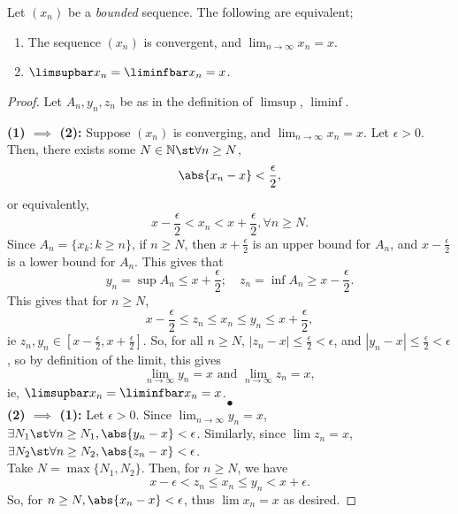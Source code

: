 \documentclass[12pt]{article}
\begin{document}
\begin{theorem}\label{thm:infsupconvergence}
  Let $(x_n)$ be a \emph{bounded} sequence. The following are equivalent;
  \begin{enumerate}
    \item The sequence $(x_n)$ is convergent, and \(\lim_{n\to\infty}x_n = x.\)
    \item $\limsupbar x_n = \liminfbar x_n = x$.
  \end{enumerate}
\end{theorem}

\begin{proof}
  Let $A_n, y_n, z_n$ be as in the definition of $\limsup$, $\liminf$.


  \textbf{(1) $\implies$ (2):} Suppose $(x_n)$ is converging, and $\lim_{n\to\infty}x_n = x$. Let $\epsilon > 0$. Then, there exists some $N \in \mathbb{N} \st \forall n \geq N$,  $$\abs{x_n - x} < \frac{\epsilon}{2},$$ or equivalently, $$x - \frac{\epsilon}{2} < x_n < x + \frac{\epsilon}{2}, \forall n \geq N.$$ Since $A_n = \{x_k : k \geq n\}$, if $n \geq N$, then $x + \frac{\epsilon}{2}$ is an upper bound for $A_n$, and $x - \frac{\epsilon}{2}$ is a lower bound for $A_n$. This gives that \[y_n = \sup A_n \leq x + \frac{\epsilon}{2}; \quad z_n = \inf A_n \geq x - \frac{\epsilon}{2}.\] This gives that for $n \geq N$, $$x - \frac{\epsilon}{2} \leq z_n \leq x_n \leq y_n \leq x + \frac{\epsilon}{2},$$ ie $z_n, y_n \in [x - \frac{\epsilon}{2}, x + \frac{\epsilon}{2}]$. So, for all $n \geq N$, $|z_n - x| \leq \frac{\epsilon}{2} < \epsilon$, and $|y_n - x| \leq \frac{\epsilon}{2} < \epsilon$, so by definition of the limit, this gives \[\lim_{n \to \infty} y_n = x \text{ and } \lim_{n\to\infty} z_n = x,\] ie, $\limsupbar x_n = \liminfbar x_n = x$.
  $$\bullet$$
  \textbf{(2) $\implies$ (1):} Let $\epsilon > 0$. Since $\lim_{n\to\infty} y_n = x$, $\exists N_1 \st \forall n \geq N_1, \abs{y_n - x }< \epsilon$. Similarly, since $\lim z_n = x$, $\exists N_2 \st \forall n \geq N_2, \abs{z_n - x} < \epsilon$.\\
  Take $N = \max \{N_1, N_2\}$. Then, for $n \geq N$, we have \[x - \epsilon < z_n \leq x_n \leq y_n < x + \epsilon.\] So, for $n \geq N, \abs{x_n - x} < \epsilon$, thus $\lim x_n = x$ as desired.
\end{proof}
\end{document}
